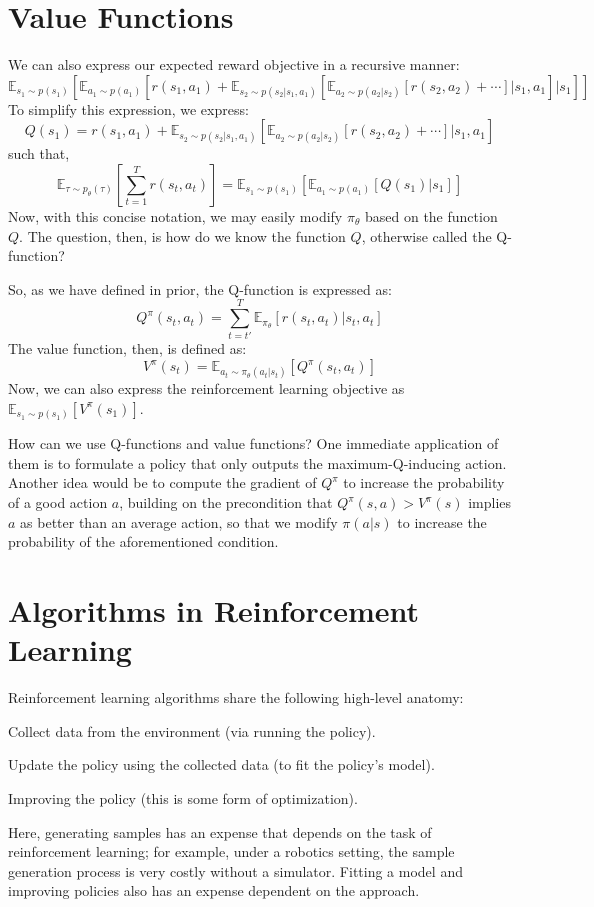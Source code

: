 \section{Value Functions}
We can also express our expected reward objective in a recursive manner:
\[
    \mathbb{E}_{s_1 \sim p(s_1)} \left[
        \mathbb{E}_{a_1 \sim p(a_1)} \left[
            r(s_1, a_1) + \mathbb{E}_{s_2 \sim p(s_2|s_1, a_1)} \left[
                \mathbb{E}_{a_2 \sim p(a_2|s_2)} \left[
                    r(s_2, a_2) + \cdots
                \right] | s_1, a_1
            \right] | s_1
        \right]
    \right]
\]
To simplify this expression, we express:
\[
    Q(s_1) = r(s_1, a_1) + \mathbb{E}_{s_2 \sim p(s_2|s_1, a_1)} \left[
        \mathbb{E}_{a_2 \sim p(a_2|s_2)} \left[
            r(s_2, a_2) + \cdots
        \right] | s_1, a_1
    \right]
\]
such that,
\[
    \mathbb{E}_{\tau \sim p_\theta (\tau)} \left[
        \sum_{t=1}^T r(s_t, a_t)
    \right] =
    \mathbb{E}_{s_1 \sim p(s_1)} \left[
        \mathbb{E}_{a_1 \sim p(a_1)} \left[
            Q(s_1) | s_1
        \right]
    \right]
\]
Now, with this concise notation, we may easily modify $\pi_\theta$ based on the function $Q$.
The question, then, is how do we know the function $Q$, otherwise called the Q-function?

So, as we have defined in prior, the Q-function is expressed as:
\[
    Q^\pi (s_t, a_t) = \sum_{t=t'}^T \mathbb{E}_{\pi_\theta} \left[ r(s_t, a_t) | s_t, a_t \right]
\]
The value function, then, is defined as:
\[
    V^\pi (s_t) = \mathbb{E}_{a_t \sim \pi_\theta(a_t | s_t)} \left[ Q^\pi (s_t, a_t) \right]
\]
Now, we can also express the reinforcement learning objective as $\mathbb{E}_{s_1 \sim p(s_1)} [V^\pi (s_1)]$.

How can we use Q-functions and value functions?
One immediate application of them is to formulate a policy that only outputs the maximum-Q-inducing action.
Another idea would be to compute the gradient of $Q^\pi$ to increase the probability of a good action $a$, building on the precondition that $Q^\pi (s, a) > V^\pi (s)$ implies $a$ as better than an average action, so that we modify $\pi (a|s)$ to increase the probability of the aforementioned condition.

\section{Algorithms in Reinforcement Learning}
Reinforcement learning algorithms share the following high-level anatomy:
\begin{bindenum}
    \item Collect data from the environment (via running the policy).
    \item Update the policy using the collected data (to fit the policy's model).
    \item Improving the policy (this is some form of optimization).
\end{bindenum}
Here, generating samples has an expense that depends on the task of reinforcement learning; for example, under a robotics setting, the sample generation process is very costly without a simulator.
Fitting a model and improving policies also has an expense dependent on the approach.

